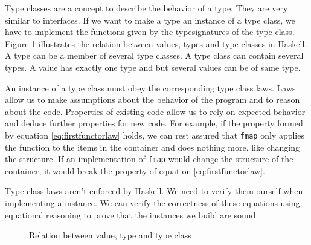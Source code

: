 Type classes are a concept to describe the behavior of a type. 
They are very similar to interfaces. If we want to make a type an instance of a type class, we have to implement the functions given by the \glspl{typesignature} of the type class. Figure \ref{fig:typeclassrelation} illustrates the relation between values, types and type classes in Haskell. A type can be a member of several type classes. A type class can contain several types. A value has exactly one type and but several values can be of same type.

An instance of a type class must obey the corresponding type class laws. Laws allow us to make assumptions about the behavior of the program and to reason about the code. Properties of existing code allow us to rely on expected behavior and deduce further properties for new code. For example, if the property formed by equation \ref{eq:firstfunctorlaw} holds, we can rest assured that \verb|fmap| only applies the function to the items in the container and does nothing more, like changing the structure. If an implementation of \verb|fmap| would change the structure of the container, it would break the property of equation \ref{eq:firstfunctorlaw}.

Type class laws aren't enforced by Haskell. We need to verify them ourself when implementing a instance. We can verify the correctness of these equations using equational reasoning to prove that the instances we build are sound. 


\begin{figure}
\centering
{}
\caption{Relation between value, type and type class}
\label{fig:typeclassrelation}
\end{figure}
